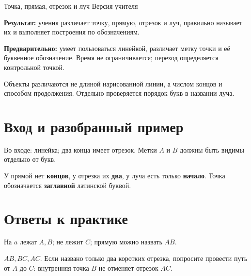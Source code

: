 \worksheettitle
  {Точка, прямая, отрезок и луч}
  { Версия учителя}

\begin{teacherbox}
  \textbf{Результат:} ученик различает точку, прямую, отрезок и луч,
  правильно называет их и выполняет построения по обозначениям.

  \textbf{Предварительно:} умеет пользоваться линейкой, различает метку точки
  и её буквенное обозначение. Время не ограничивается; переход определяется
  контрольной точкой.
\end{teacherbox}

\begin{teacherbox}
  Объекты различаются не длиной нарисованной линии, а числом концов и способом
  продолжения. Отдельно проверяется порядок букв в названии луча.
\end{teacherbox}

\section{Вход и разобранный пример}

Во входе: линейка; два конца имеет отрезок. Метки $A$ и $B$ должны быть
видимы отдельно от букв.

\objectscomparisonfigure

\begin{propertybox}
  У прямой нет \textbf{концов}, у отрезка их \textbf{два}, у луча есть
  только \textbf{начало}. Точка обозначается \textbf{заглавной} латинской
  буквой.
\end{propertybox}

\section{Ответы к практике}

\incidenceexamplefigure

\begin{practicebox}
  На $a$ лежат $A,B$; не лежит $C$; прямую можно назвать $AB$.
\end{practicebox}

\threelinepointsfigure

\begin{practicebox}
  $AB,BC,AC$. Если названо только два коротких отрезка, попросите провести
  путь от $A$ до $C$: внутренняя точка $B$ не отменяет отрезок $AC$.
\end{practicebox}

